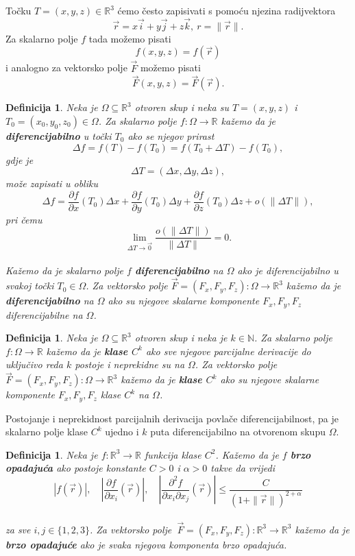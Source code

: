 \documentclass[12pt,a4paper]{article}
\newtheorem{deff}[tm]{Definicija}
\begin{document}
Točku $T=(x,y,z)\in\mathbb{R}^3$ ćemo često zapisivati s pomoću njezina
radijvektora
$$
\overrightarrow{r}
=
x\overrightarrow{i}
+
y\overrightarrow{j}
+
z\overrightarrow{k},\ r=\|\overrightarrow{r}\|.
$$
Za skalarno polje $f$ tada možemo pisati
\[
f(x,y,z)=f(\overrightarrow{r})
\]
i analogno za vektorsko polje $\overrightarrow{F}$ možemo pisati
\[
\overrightarrow{F}(x,y,z)=\overrightarrow{F}(\overrightarrow{r}).
\]
\begin{deff}
Neka je $\Omega\subseteq\mathbb{R}^3$ otvoren skup i neka su
$T=(x,y,z)$ i
$T_0=(x_0,y_0,z_0)\in\Omega$.
Za skalarno polje $f:\Omega\to\mathbb{R}$ kažemo da je
\textbf{diferencijabilno} u točki $T_0$ ako se njegov prirast
$$
\Delta f
=
f(T)-f(T_0)
=
f(T_0+\Delta T)-f(T_0),
$$
gdje je
$$
\Delta T
=
(\Delta x,\Delta y,\Delta z),
$$
može zapisati u obliku
$$
\Delta f
=
\frac{\partial f}{\partial x}(T_0)\Delta x
+\frac{\partial f}{\partial y}(T_0)\Delta y+
\frac{\partial f}{\partial z}(T_0)\Delta z
+o(\|\Delta T\|),
$$
pri čemu
$$
\lim\limits_{\Delta T\to\overrightarrow{0}}
\frac{o(\|\Delta T\|)}{\|\Delta T\|}
=
0.
$$\\
Kažemo da je skalarno polje $f$ \textbf{diferencijabilno} na $\Omega$ ako je
diferencijabilno u svakoj točki $T_0\in\Omega$. Za vektorsko polje
$\overrightarrow{F}=(F_x,F_y,F_z):\Omega\to\mathbb{R}^3$
kažemo da je \textbf{diferencijabilno} na $\Omega$ ako su njegove
skalarne komponente $F_x,F_y,F_z$ diferencijabilne na $\Omega$.
\end{deff}
\begin{deff}
Neka je $\Omega\subseteq\mathbb{R}^3$ otvoren skup i neka je
$k\in\mathbb{N}$. Za skalarno polje
$f:\Omega\to\mathbb{R}$
kažemo da je \textbf{klase $C^k$} ako sve njegove parcijalne derivacije do
uključivo reda $k$ postoje i neprekidne su na $\Omega$. Za vektorsko polje
$\overrightarrow{F}=(F_x,F_y,F_z):\Omega\to\mathbb{R}^3$
kažemo da je \textbf{klase $C^k$} ako su njegove skalarne komponente
$F_x,F_y,F_z$ klase $C^k$ na $\Omega$.
\end{deff}
Postojanje i neprekidnost parcijalnih derivacija povlače diferencijabilnost,
pa je skalarno polje klase $C^k$ ujedno i $k$ puta diferencijabilno na
otvorenom skupu $\Omega$.

\begin{deff}
     Neka je \(f:\mathbb{R}^3\to\mathbb{R}\) funkcija klase \(C^2\).  Kažemo da je \(f\) \textbf{brzo opadajuća} ako postoje konstante \(C>0\) i \(\alpha>0\) takve da vrijedi\\
	$$ |f(\overrightarrow{r})|,\quad \left|\frac{\partial f}{\partial x_i}(\overrightarrow{r})\right|,\quad \left|\frac{\partial^2f}{\partial x_i\partial x_j}(\overrightarrow{r})\right| \le \frac{C}{(1+\|\overrightarrow{r}\|)^{2+\alpha}} $$\\
	za sve \(i,j\in\{1,2,3\}\). Za vektorsko polje
\(\ \overrightarrow{F}=(F_x,F_y,F_z):\mathbb{R}^3\to\mathbb{R}^3\) kažemo da je \textbf{brzo opadajuće} ako je svaka njegova komponenta brzo opadajuća.
	\end{deff}
\end{document}

